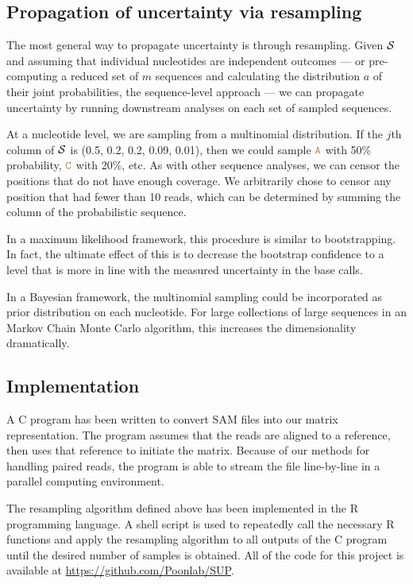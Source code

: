 \documentclass[10pt]{article}
\begin{document}
\subsection{Propagation of uncertainty via resampling}

The most general way to propagate uncertainty is through resampling.
Given $\mathcal{S}$ and assuming that individual nucleotides are independent outcomes --- or pre-computing a reduced set of $m$ sequences and calculating the distribution $a$ of their joint probabilities, \ie the sequence-level approach --- we can propagate uncertainty by running downstream analyses on each set of sampled sequences.

At a nucleotide level, we are sampling from a multinomial distribution.
If the $j$th column of $\mathcal{S}$ is (0.5, 0.2, 0.2, 0.09, 0.01), then we could sample $\texttt{\textcolor{brown}{A}}$ with 50\% probability, $\texttt{\textcolor{brown}{C}}$ with 20\%, etc.
As with other sequence analyses, we can censor the positions that do not have enough coverage.
We arbitrarily chose to censor any position that had fewer than 10 reads, which can be determined by summing the column of the probabilistic sequence.

In a maximum likelihood framework, this procedure is similar to bootstrapping.
In fact, the ultimate effect of this is to decrease the bootstrap confidence to a level that is more in line with the measured uncertainty in the base calls.

In a Bayesian framework, the multinomial sampling could be incorporated as prior distribution on each nucleotide.
For large collections of large sequences in an Markov Chain Monte Carlo algorithm, this increases the dimensionality dramatically.

\subsection{Implementation}

A C program has been written to convert SAM files into our matrix representation.
The program assumes that the reads are aligned to a reference, then uses that reference to initiate the matrix.
Because of our methods for handling paired reads, the program is able to stream the file line-by-line in a parallel computing environment.

The resampling algorithm defined above has been implemented in the R programming language.
A shell script is used to repeatedly call the necessary R functions and apply the resampling algorithm to all outputs of the C program until the desired number of samples is obtained.
All of the code for this project is available at \url{https://github.com/Poonlab/SUP}.
\end{document}

